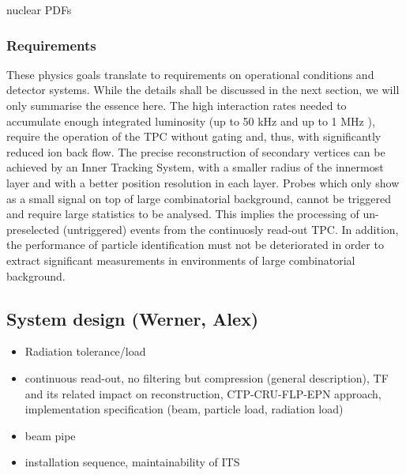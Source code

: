 nuclear PDFs

\subsubsection{Requirements}
\label{sec:physics_motivation}

These physics goals translate to requirements on operational conditions and detector systems. While the details shall be discussed in the next section, we will only summarise the essence here. The high interaction rates needed to accumulate enough integrated luminosity (up to 50 kHz \PbPb{} and up to 1 MHz \pp{}), require the operation of the TPC without gating and, thus, with significantly reduced ion back flow. The precise reconstruction of secondary vertices can be achieved by an Inner Tracking System, with a smaller radius of the innermost layer and with a better position resolution in each layer. Probes which only show as a small signal on top of large combinatorial background, cannot be triggered and require large statistics to be analysed. This implies the processing of un-preselected (untriggered) events from the continuosly read-out TPC. In addition, the performance of particle identification must not be deteriorated in order to extract significant measurements in environments of large combinatorial background.

\subsection{System design (Werner, Alex)}
\begin{itemize}
\item Radiation tolerance/load
\item continuous read-out, no filtering but compression (general description), TF and its related impact on reconstruction, CTP-CRU-FLP-EPN approach, implementation specification (beam, particle load, radiation load)
\item beam pipe
\item installation sequence, maintainability of ITS
\end{itemize}
